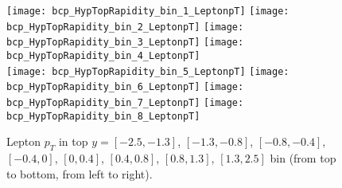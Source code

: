\begin{landscape}
% 
% 
% 






\begin{figure}
  \texttt{[image: bcp\_HypTopRapidity\_bin\_1\_LeptonpT]}
  \texttt{[image: bcp\_HypTopRapidity\_bin\_2\_LeptonpT]}
  \texttt{[image: bcp\_HypTopRapidity\_bin\_3\_LeptonpT]}
  \texttt{[image: bcp\_HypTopRapidity\_bin\_4\_LeptonpT]}\\
  \texttt{[image: bcp\_HypTopRapidity\_bin\_5\_LeptonpT]}
  \texttt{[image: bcp\_HypTopRapidity\_bin\_6\_LeptonpT]}
  \texttt{[image: bcp\_HypTopRapidity\_bin\_7\_LeptonpT]}
  \texttt{[image: bcp\_HypTopRapidity\_bin\_8\_LeptonpT]}
\caption{Lepton $p_T$ in top $y = [-2.5,-1.3]$, $[-1.3,-0.8]$, $[-0.8,-0.4]$, $[-0.4,0]$, $[0,0.4]$, $[0.4,0.8]$, $[0.8,1.3]$, $[1.3,2.5]$ bin (from top to bottom, from left to right).}
\end{figure}

\clearpage
\newpage







\end{landscape}

